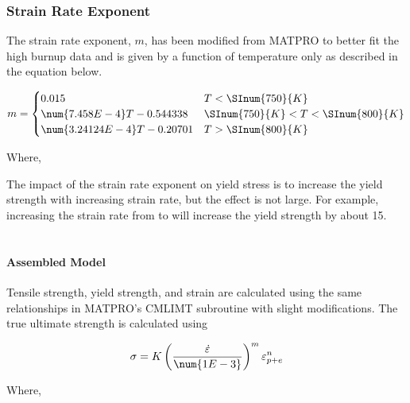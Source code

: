 \subsubsection{Strain Rate Exponent}\label{section:strain-rate-exponent}

The strain rate exponent, $m$, has been modified from MATPRO to better fit the high burnup data and
is given by a function of temperature only as described in the equation below.

\begin{equation}
    \label{eq:strain_rate_exponent_Zirc}
    m =
    \begin{cases}

        0.015                           & T<\SInum{750}{K}      \\
        \num{7.458E-4}T-0.544338        & \SInum{750}{K}<T<\SInum{800}{K} \\
        \num{3.24124E-4}T-0.20701       & T>\SInum{800}{K}

    \end{cases}
\end{equation}

Where,


The impact of the strain rate exponent on yield stress is to increase the yield strength with
increasing strain rate, but the effect is not large. For example, increasing the strain rate from
 to  will increase the yield strength by about 15\percent.
\\
\\
\paragraph{Assembled Model}

Tensile strength, yield strength, and strain are calculated using the same relationships in MATPRO's
CMLIMT subroutine with slight modifications. The true ultimate strength is calculated using

\begin{equation}
    \label{eq:true_ultimate_strength}
    \sigma = K\left(\frac{\dot{\varepsilon}}{\num{1E-3}}\right)^{m}\varepsilon^{n}_{p+e}
\end{equation}


Where,

